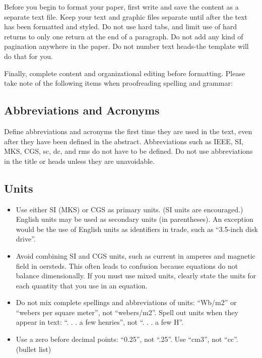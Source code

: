 \documentclass[letterpaper, 10 pt, conference]{ieeeconf}  %
\begin{document}
Before you begin to format your paper, first write and save the content as a separate text file. Keep your text and graphic files separate until after the text has been formatted and styled. Do not use hard tabs, and limit use of hard returns to only one return at the end of a paragraph. Do not add any kind of pagination anywhere in the paper. Do not number text heads-the template will do that for you.

Finally, complete content and organizational editing before formatting. Please take note of the following items when proofreading spelling and grammar:

\subsection{Abbreviations and Acronyms} Define abbreviations and acronyms the first time they are used in the text, even after they have been defined in the abstract. Abbreviations such as IEEE, SI, MKS, CGS, sc, dc, and rms do not have to be defined. Do not use abbreviations in the title or heads unless they are unavoidable.

\subsection{Units}

\begin{itemize}

\item Use either SI (MKS) or CGS as primary units. (SI units are encouraged.) English units may be used as secondary units (in parentheses). An exception would be the use of English units as identifiers in trade, such as ``3.5-inch disk drive''.
\item Avoid combining SI and CGS units, such as current in amperes and magnetic field in oersteds. This often leads to confusion because equations do not balance dimensionally. If you must use mixed units, clearly state the units for each quantity that you use in an equation.
\item Do not mix complete spellings and abbreviations of units: ``Wb/m2'' or ``webers per square meter'', not ``webers/m2''.  Spell out units when they appear in text: ``. . . a few henries'', not ``. . . a few H''.
\item Use a zero before decimal points: ``0.25'', not ``.25''. Use ``cm3'', not ``cc''. (bullet list)

\end{itemize}
\end{document}
